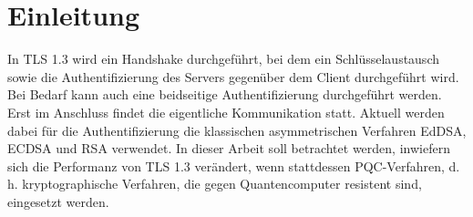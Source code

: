 \chapter{Einleitung}

\label{ch:intro}

In TLS 1.3 wird ein Handshake durchgeführt, bei dem ein Schlüsselaustausch sowie die Authentifizierung des Servers gegenüber dem Client durchgeführt wird. Bei Bedarf kann auch eine beidseitige Authentifizierung durchgeführt werden. Erst im Anschluss findet die eigentliche Kommunikation statt. Aktuell werden dabei für die Authentifizierung die klassischen asymmetrischen Verfahren EdDSA, ECDSA und RSA verwendet. In dieser Arbeit soll betrachtet werden, inwiefern sich die Performanz von TLS 1.3 verändert, wenn stattdessen PQC-Verfahren, d. h. kryptographische Verfahren, die gegen Quantencomputer resistent sind, eingesetzt werden.